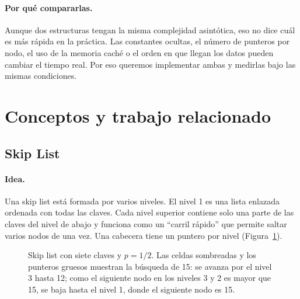\documentclass[11pt,a4paper]{article}
\begin{document}
\paragraph{Por qué compararlas.}
Aunque dos estructuras tengan la misma complejidad asintótica, eso no dice cuál
es más rápida en la práctica. Las constantes ocultas, el número de punteros por nodo,
el uso de la memoria caché o el orden en que llegan los datos pueden cambiar el
tiempo real. Por eso queremos implementar ambas y medirlas bajo las mismas condiciones.


\section{Conceptos y trabajo relacionado}\label{sec:conceptos}

\subsection{Skip List}

\paragraph{Idea.}
Una skip list está formada por varios niveles. El nivel 1 es una lista enlazada
ordenada con todas las claves. Cada nivel superior contiene solo una parte de
las claves del nivel de abajo y funciona como un ``carril rápido'' que permite
saltar varios nodos de una vez. Una cabecera tiene un puntero por nivel
(Figura~\ref{fig:skiplist}).

\begin{figure}[!htb]
\centering
{}
\caption{Skip list con siete claves y $p = 1/2$. Las celdas sombreadas y los
punteros gruesos muestran la búsqueda de 15: se avanza por el nivel 3 hasta
12; como el siguiente nodo en los niveles 3 y 2 es mayor que 15, se baja hasta
el nivel 1, donde el siguiente nodo es 15.}
\label{fig:skiplist}
\end{figure}
\end{document}

